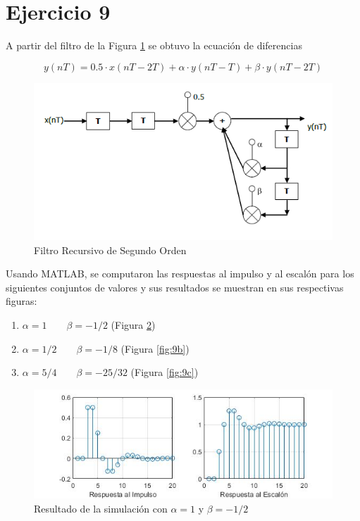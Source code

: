 \chapter*{Ejercicio 9}
A partir del filtro de la Figura \ref{fig:e9filtro} se obtuvo la ecuación de diferencias

\begin{equation}
    y(nT)=0.5 \cdot x(nT -2T) + \alpha \cdot y(nT-T) + \beta \cdot y(nT-2T)
\end{equation}

\begin{figure}[ht]
    \centering
    \includegraphics{ej9.png}
    \caption{Filtro Recursivo de Segundo Orden}
    \label{fig:e9filtro}
\end{figure}

Usando MATLAB, se computaron las respuestas al impulso y al escalón para los siguientes conjuntos de valores y sus resultados se muestran en sus respectivas figuras:
\begin{enumerate}
    \item \(\alpha  = 1 \qquad \beta = -1/2 \) (Figura \ref{fig:9a})
    \item \(\alpha  = 1/2 \qquad \beta = -1/8\) (Figura \ref{fig:9b})
    \item \(\alpha  = 5/4 \qquad \beta = -25/32 \) (Figura \ref{fig:9c})
\end{enumerate}

\begin{figure}
    \centering
    \includegraphics[width=\linewidth]{sim9a.jpg}
    \caption{Resultado de la simulación con $\alpha=1$ y $\beta=-1/2$}
    \label{fig:9a}
\end{figure}

